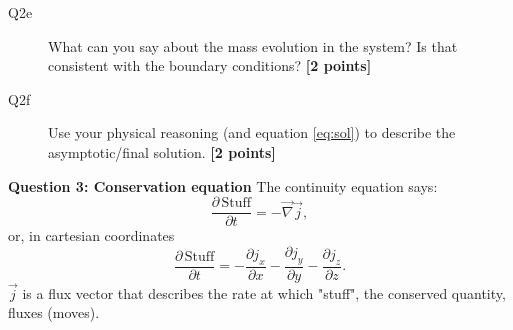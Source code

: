\documentclass{article}
\begin{document}

\begin{description}
\item [Q2e] What can you say about the mass evolution in the system? Is that consistent with the boundary conditions? \textbf{[2 points]}
\vspace{2cm}

\item [Q2f] Use your physical reasoning (and equation \ref{eq:sol}) to describe the asymptotic/final solution. \textbf{[2 points]}
\vspace{2cm}

\end{description}

\textbf{Question 3: Conservation equation}
The continuity equation says:
\begin{equation}
\frac{\partial \, \mathrm{Stuff}}{\partial t} = - \overrightarrow{\nabla }\overrightarrow{j},
\end{equation} or, in cartesian coordinates
\begin{equation}
\frac{\partial \, \mathrm{Stuff}}{\partial t} = - \frac{\partial j_x}{\partial x} - \frac{\partial j_y}{\partial y} - \frac{\partial j_z}{\partial z}.
\end{equation} $ \overrightarrow{j} $ is a flux vector that describes the rate at which "stuff", the conserved quantity, fluxes (moves).
\end{document}

